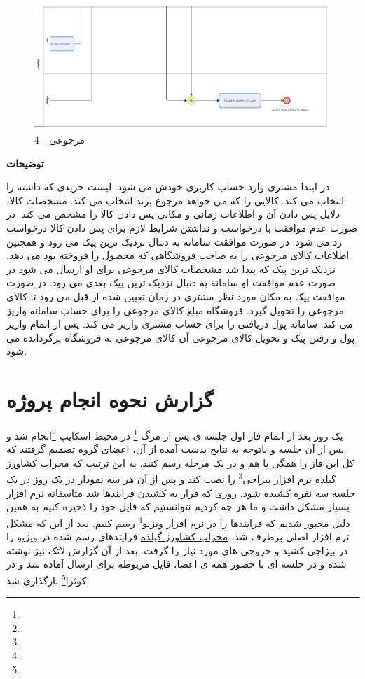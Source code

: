 \documentclass[12pt,a4paper]{article}
\begin{document}
\begin{figure}[h!]
	\begin{center}
		\includegraphics[width=14cm]{images/Bizagi Return 4.png}	
	\end{center}
	\caption{مرجوعی - 4}
\end{figure}

\textbf{توضیحات}


در ابتدا مشتری وارد حساب کاربری خودش می شود. لیست خریدی که داشته را انتخاب می کند. کالایی را که می خواهد مرجوع بزند انتخاب می کند. مشخصات کالا، دلایل پس دادن آن و اطلاعات زمانی و مکانی پس دادن کالا را مشخص می کند. در صورت عدم موافقت با درخواست و نداشتن شرایط لازم برای پس دادن کالا درخواست رد می شود. در صورت موافقت سامانه به دنبال نزدیک ترین پیک می رود و همچنین اطلاعات کالای مرجوعی را به صاحب فروشگاهی که محصول را فروخته بود می دهد. نزدیک ترین پیک که پیدا شد مشخصات کالای مرجوعی برای او ارسال می شود در صورت عدم موافقت او سامانه به دنبال نزدیک ترین پیک بعدی می رود. در صورت موافقت پیک به مکان مورد نظر مشتری در زمان تعیین شده از قبل می رود تا کالای مرجوعی را تحویل گیرد. فروشگاه مبلغ کالای مرجوعی را برای حساب سامانه واریز می کند. سامانه پول دریافتی را برای حساب مشتری واریز می کند. پس از اتمام واریز پول و رفتن پیک و تحویل کالای مرجوعی آن کالای مرجوعی به فروشگاه برگردانده می شود.

\pagebreak

\section{گزارش نحوه انجام پروژه} \label{section.report}
یک روز بعد از اتمام فاز اول جلسه ی پس از مرگ \footnote{} در محیط اسکایپ \footnote{}انجام شد و پس از آن جلسه و باتوجه به نتایج بدست آمده از آن، اعضای گروه تصمیم گرفتند که کل این فاز را همگی با هم و در یک مرحله رسم کنند. به این ترتیب که \underline{محراب کشاورز گیلده} نرم افزار بیزاجی\footnote{} را نصب کند و پس از آن هر سه نمودار در یک روز در یک جلسه سه نفره کشیده شود. روزی که قرار به کشیدن فرایندها شد متاسفانه نرم افزار بسیار مشکل داشت و ما هر چه کردیم نتوانستیم که فایل خود را ذخیره کنیم به همین دلیل مجبور شدیم که فرایندها را در نرم افزار ویزیو\footnote{} رسم کنیم. بعد از این که مشکل نرم افزار اصلی برطرف شد، \underline{محراب کشاورز گیلده} فرایندهای رسم شده در ویزیو را در بیزاجی کشید و خروجی های مورد نیاز را گرفت. بعد از آن گزارش لاتک نیز نوشته شده و در جلسه ای با حضور همه ی اعضا، فایل مربوطه برای ارسال آماده شد و در کوئرا\footnote{} بارگذاری شد.
\end{document}
